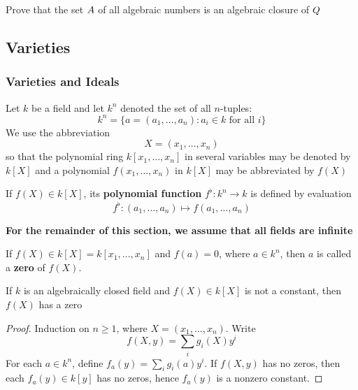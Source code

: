 \documentclass[11pt]{article}
\begin{document}
\begin{exercise}
\label{nex5.46}
Prove that the set \(\relax{A}\) of all algebraic numbers is an algebraic closure of \(\relax{Q}\)
\end{exercise}
\subsection{Varieties}
\label{sec:orga7cf941}
\subsubsection{Varieties and Ideals}
\label{sec:org363b18a}

Let \(k\) be a field and let \(k^n\) denoted the set of all \(n\)-tuples:
\begin{equation*}
k^n=\{a=(a_1,\dots,a_n):a_i\in k\text{ for all }i\}
\end{equation*}
We use the abbreviation
\begin{equation*}
X=(x_1,\dots,x_n)
\end{equation*}
so that the polynomial ring \(k[x_1,\dots,x_n]\) in several variables may be
denoted by \(k[X]\) and a polynomial \(f(x_1,\dots,x_n)\) in \(k[X]\) may be
abbreviated by \(f(X)\)
\begin{definition}[]
If \(f(X)\in k[X]\), its \textbf{polynomial function} \(f^{\flat}:k^n\to k\) is
defined by evaluation
\begin{equation*}
f^\flat:(a_1,\dots,a_n)\mapsto f(a_1,\dots,a_n)
\end{equation*}
\end{definition}

\textbf{For the remainder of this section, we assume that all fields are infinite}

\begin{definition}[]
If \(f(X)\in k[X]=k[x_1,\dots,x_n]\) and \(f(a)=0\), where \(a\in k^n\),
then \(a\) is called a \textbf{zero} of \(f(X)\).
\end{definition}

\begin{proposition}[]
If \(k\) is an algebraically closed field and \(f(X)\in k[X]\) is not a
constant, then \(f(X)\) has a zero
\end{proposition}

\begin{proof}
Induction on \(n\ge1\), where \(X=(x_1,\dots,x_n)\). Write
\begin{equation*}
f(X,y)=\displaystyle\sum_{i}g_i(X)y^i
\end{equation*}
For each \(a\in k^n\), define \(f_a(y)=\sum_ig_i(a)y^i\). If \(f(X,y)\) has
no zeros, then each \(f_a(y)\in k[y]\) has no zeros, hence \(f_a(y)\) is a
nonzero constant.
\end{proof}
\end{document}
